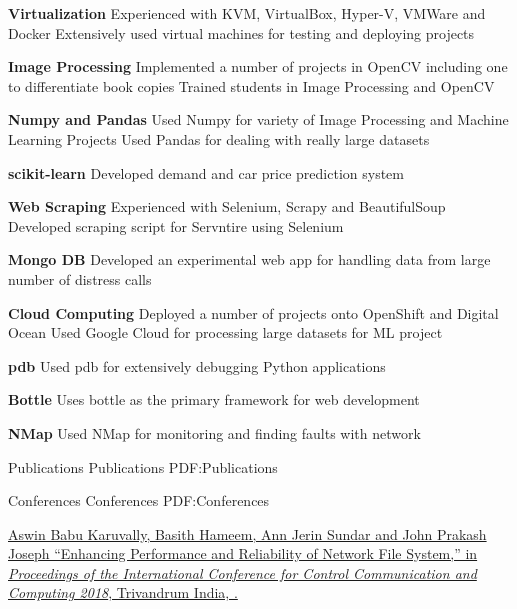 \documentclass[letterpaper,MMMyyyy,nonstopmode]{simpleresumecv}
\begin{document}
\begin{Body}
\BigGap
\BulletItem
\textbf{Virtualization}
\SubBulletItem
Experienced with KVM, VirtualBox, Hyper-V, VMWare and Docker
\SubBulletItem
Extensively used virtual machines for testing and deploying projects

\BigGap
\BulletItem
\textbf{Image Processing}
\SubBulletItem
Implemented a number of projects in OpenCV including one to differentiate book
copies
\SubBulletItem
Trained students in Image Processing and OpenCV

\BigGap
\BulletItem
\textbf{Numpy and Pandas}
\SubBulletItem
Used Numpy for variety of Image Processing and Machine Learning Projects
\SubBulletItem
Used Pandas for dealing with really large datasets

\BigGap
\BulletItem
\textbf{scikit-learn}
\SubBulletItem
Developed demand and car price prediction system

\BigGap
\BulletItem
\textbf{Web Scraping}
\SubBulletItem
Experienced with Selenium, Scrapy and BeautifulSoup
\SubBulletItem
Developed scraping script for Servntire using Selenium

\BigGap
\BulletItem
\textbf{Mongo DB}
\SubBulletItem
Developed an experimental web app for handling data from large number of
distress calls

\BigGap
\BulletItem
\textbf{Cloud Computing}
\SubBulletItem
Deployed a number of projects onto OpenShift and Digital Ocean
\SubBulletItem
Used Google Cloud for processing large datasets for ML project

\BigGap
\BulletItem
\textbf{pdb}
\SubBulletItem
Used pdb for extensively debugging Python applications

\BigGap
\BulletItem
\textbf{Bottle}
\SubBulletItem
Uses bottle as the primary framework for web development

\BigGap
\BulletItem
\textbf{NMap}
\SubBulletItem
Used NMap for monitoring and finding faults with network


\pagebreak
\Section
{Publications}
{Publications}
{PDF:Publications}

\SubSection
{Conferences}
{Conferences}
{PDF:Conferences}

\begingroup
\renewcommand{\MaxNumberedItem}{[8888]}

\NumberedItem{[1]}
\href{https://ieeexplore.ieee.org/document/8531062}
{\underline{Aswin Babu Karuvally}, Basith Hameem, Ann Jerin Sundar and John
Prakash Joseph ``Enhancing Performance and Reliability of Network File System,''
in \textit{Proceedings of the International Conference for Control Communication
and Computing 2018}, Trivandrum India,
.}


\end{Body}
\end{document}

